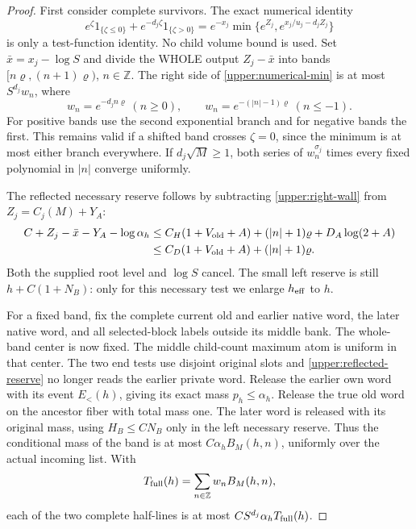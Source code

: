 \begin{proof}
First consider complete survivors.  The exact numerical identity
\begin{equation}
 e^\zeta1_{\{\zeta\leq0\}}+e^{-d_j\zeta}1_{\{\zeta>0\}}
 =e^{-x_j}\min\{e^{Z_j},e^{x_j/u_j-d_jZ_j}\}
 \label{upper:numerical-min}
\end{equation}
is only a test-function identity.  No child volume bound is used.
Set $\bar x=x_j-\log S$ and divide the WHOLE output $Z_j-\bar x$
into bands $[n\varrho,(n+1)\varrho)$, $n\in\mathbb Z$.
The right side of \eqref{upper:numerical-min} is at most $S^{d_j}w_n$,
where
\begin{equation}
 w_n=e^{-d_jn\varrho}\ (n\geq0),\qquad
 w_n=e^{-(|n|-1)\varrho}\ (n\leq-1).
 \label{upper:signed-band-weights}
\end{equation}
For positive bands use the second exponential branch and for negative
bands the first.  This remains valid if a shifted band crosses
$\zeta=0$, since the minimum is at most either branch everywhere.
If $d_j\sqrt M\geq1$, both series of $w_n^{\sigma_j}$ times every
fixed polynomial in $|n|$ converge uniformly.

The reflected necessary reserve follows by subtracting
\eqref{upper:right-wall} from $Z_j=C_j(M)+Y_A$:
\begin{align}
 C+Z_j-\bar x-Y_A-\log\alpha_h
 &\leq C_H(1+V_{\rm old}+A)+(|n|+1)\varrho
                                  +D_A\log(2+A)\notag\\
 &\leq C_D(1+V_{\rm old}+A)+(|n|+1)\varrho.
 \label{upper:reflected-reserve}
\end{align}
Both the supplied root level and $\log S$ cancel.  The small left
reserve is still $h+C(1+N_B)$: only for this necessary test we enlarge
$h_{\rm eff}$ to $h$.

For a fixed band, fix the complete current old and earlier native word,
the later native word, and all selected-block labels outside its middle
bank.  The whole-band center is now fixed.  The middle child-count
maximum atom is uniform in that center.  The two end tests use disjoint
original slots and \eqref{upper:reflected-reserve} no longer reads the
earlier private word.  Release the earlier own word with its event
$E_<(h)$, giving its exact mass $p_h\leq\alpha_h$.  Release the true
old word on the ancestor fiber with total mass one.  The later word is
released with its original mass, using $H_B\leq CN_B$ only in the
left necessary reserve.  Thus the conditional mass of the band is at
most $C\alpha_h B_M(h,n)$, uniformly over the actual incoming list.
With
\[
 T_{\rm full}(h)=\sum_{n\in\mathbb Z}w_n B_M(h,n),
\]
each of the two complete half-lines is at most
$CS^{d_j}\alpha_h T_{\rm full}(h)$.


\end{proof}
